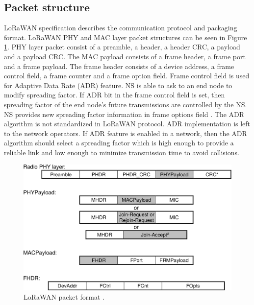 \subsection{Packet structure}
LoRaWAN specification describes the communication protocol and packaging format. LoRaWAN PHY and MAC layer packet structures can be seen in Figure \ref{fig:lorawan_mac}. PHY layer packet consist of a preamble, a header, a header CRC, a payload and a payload CRC. The MAC payload consists of a frame header, a frame port and a frame payload. The frame header consists of a device address, a frame control field, a frame counter and a frame option field. Frame control field is used for Adaptive Data Rate (ADR) feature. NS is able to ask to an end node to modify spreading factor. If ADR bit in the frame control field is set, then spreading factor of the end node's future transmissions are controlled by the NS. NS provides new spreading factor information in frame options field \cite{lorawan.specification}. The ADR algorithm is not standardized in LoRaWAN protocol. ADR implementation is left to the network operators. If ADR feature is enabled in a network, then the ADR algorithm should select a spreading factor which is high enough to provide a reliable link and low enough to minimize transmission time to avoid collisions.

\begin{figure}
\centering
\includegraphics[width=\linewidth]{fig/lorawan_mac.png}
\vspace*{4mm}
\caption{LoRaWAN packet format \cite{lorawan.specification}.}
\label{fig:lorawan_mac}
\end{figure}



